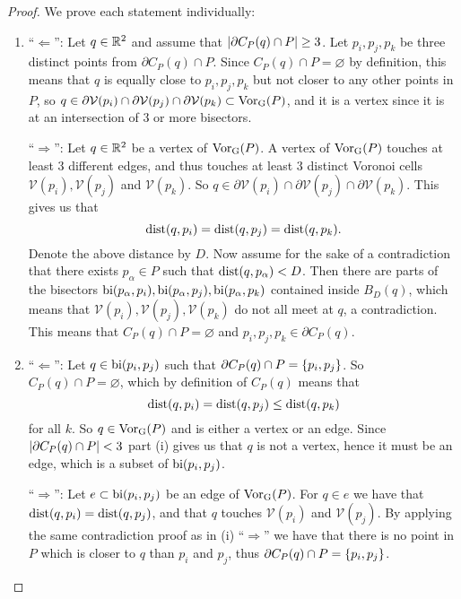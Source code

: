 \begin{proof}
We prove each statement individually:
\begin{enumerate}[{(}i{):}]
    \item ``$\Leftarrow$'': Let $q \in \mathbb{R}^2$ and assume that $\left\lvert \partial C_P(q) \cap P \right\rvert \geq 3$. Let $p_i, p_j, p_k$ be three distinct points from $\partial C_P(q) \cap P$. Since $C_P(q) \cap P = \varnothing$ by definition, this means that $q$ is equally close to $p_i, p_j, p_k$ but not closer to any other points in $P$, so $q \in \partial\mathcal{V}(p_i) \cap \partial\mathcal{V}(p_j) \cap \partial\mathcal{V}(p_k) \subset \operatorname{Vor_{G}}(P)$, and it is a vertex since it is at an intersection of 3 or more bisectors.

    ``$\Rightarrow$'': Let $q \in \mathbb{R}^2$ be a vertex of $\operatorname{Vor_{G}}(P)$. A vertex of $\operatorname{Vor_{G}}(P)$ touches at least 3 different edges, and thus touches at least 3 distinct Voronoi cells $\mathcal{V}(p_i), \mathcal{V}(p_j)$ and $\mathcal{V}(p_k)$. So $q \in \partial\mathcal{V}(p_i) \cap \partial\mathcal{V}(p_j) \cap \partial\mathcal{V}(p_k)$. This gives us that
    \[
        \operatorname{dist}(q, p_i) = \operatorname{dist}(q, p_j) = \operatorname{dist}(q, p_k).
    \]
    Denote the above distance by $D$. Now assume for the sake of a contradiction that there exists $p_\alpha \in P$ such that $\operatorname{dist}(q, p_{\alpha}) < D$. Then there are parts of the bisectors $\operatorname{bi}(p_{\alpha}, p_i), \operatorname{bi}(p_{\alpha}, p_j), \operatorname{bi}(p_{\alpha}, p_k)$ contained inside $B_D(q)$, which means that $\mathcal{V}(p_i), \mathcal{V}(p_j), \mathcal{V}(p_k)$ do not all meet at $q$, a contradiction. This means that $C_P(q) \cap P = \varnothing$ and $p_i, p_j, p_k \in \partial C_P(q)$.

    \item ``$\Leftarrow$'': Let $q \in \operatorname{bi}(p_i, p_j)$ such that $\partial C_P(q) \cap P = \{p_i, p_j\}$. So $C_P(q) \cap P = \varnothing$, which by definition of $C_P(q)$ means that
    \[
        \operatorname{dist}(q, p_i) = \operatorname{dist}(q, p_j) \leq \operatorname{dist}(q, p_k)
    \]
    for all $k$. So $q \in \operatorname{Vor_{G}}(P)$ and is either a vertex or an edge. Since $\left\lvert \partial C_P(q) \cap P \right\rvert < 3$ part (i) gives us that $q$ is not a vertex, hence it must be an edge, which is a subset of $\operatorname{bi}(p_i, p_j)$. 

    ``$\Rightarrow$'': Let $e \subset \operatorname{bi}(p_i, p_j)$ be an edge of $\operatorname{Vor_{G}}(P)$. For $q \in e$ we have that $\operatorname{dist}(q, p_i) = \operatorname{dist}(q, p_j)$, and that $q$ touches $\mathcal{V}(p_i)$ and $\mathcal{V}(p_j)$. By applying the same contradiction proof as in (i) ``$\Rightarrow$'' we have that there is no point in $P$ which is closer to $q$ than $p_i$ and $p_j$, thus $\partial C_P(q) \cap P = \{p_i, p_j\}$.
\end{enumerate}
\end{proof}

